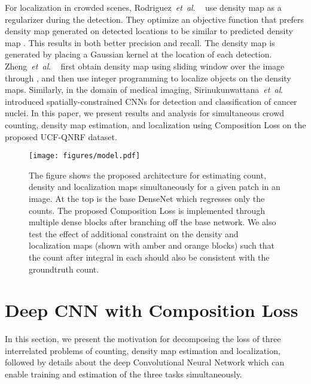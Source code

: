 \documentclass[runningheads]{llncs}
\newcommand{\etal}{\textit{et~al}. }
\begin{document}
For localization in crowded scenes, Rodriguez~\etal~\cite{rodriguez-iccv11b} use density map as a regularizer during the detection. They optimize an objective function that prefers density map generated on detected locations to be similar to predicted density map \cite{zisserman-nips10}. This results in both better precision and recall. The density map is generated by placing a Gaussian kernel at the location of each detection. Zheng~\etal~\cite{ma2015small} first obtain density map using sliding window over the image through \cite{zisserman-nips10}, and then use integer programming to localize objects on the density maps. Similarly, in the domain of medical imaging, Sirinukunwattana~\etal~\cite{sirinukunwattana2016locality} introduced spatially-constrained CNNs for detection and classification of cancer nuclei. In this paper, we present results and analysis for simultaneous crowd counting, density map estimation, and localization using Composition Loss on the proposed UCF-QNRF dataset.

\begin{figure}[t]
\centering
\texttt{[image: figures/model.pdf]}
\caption{{The figure shows the proposed architecture for estimating count, density and localization maps simultaneously for a given patch in an image. At the top is the base DenseNet which regresses only the counts. The proposed Composition Loss is implemented through multiple dense blocks after branching off the base network. We also test the effect of additional constraint on the density and localization maps (shown with amber and orange blocks) such that the count after integral in each should also be consistent with the groundtruth count. }}
\label{figModel}
\end{figure}

\section{Deep CNN with Composition Loss}\label{secProposedApproach}
In this section, we present the motivation for decomposing the loss of three interrelated problems of counting, density map estimation and localization, followed by details about the deep Convolutional Neural Network which can enable training and estimation of the three tasks simultaneously.
\end{document}
